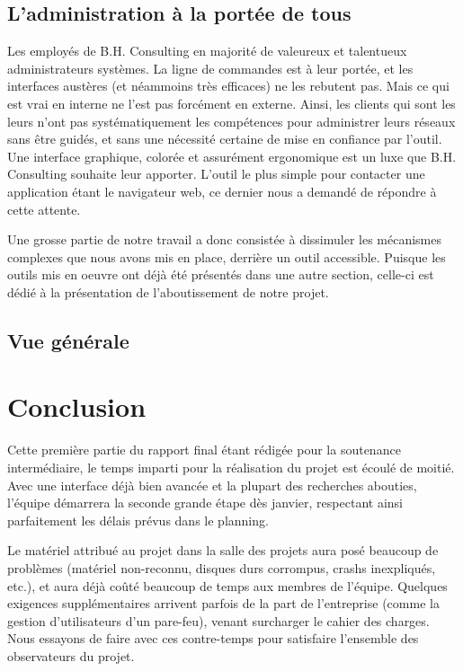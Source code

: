 \subsection{L'administration à la portée de tous}

Les employés de B.H. Consulting en majorité de valeureux et talentueux administrateurs systèmes. La ligne de commandes est à leur portée, et les interfaces austères (et néammoins très efficaces) ne les rebutent pas. Mais ce qui est vrai en interne ne l'est pas forcément en externe. Ainsi, les clients qui sont les leurs n'ont pas systématiquement les compétences pour administrer leurs réseaux sans être guidés, et sans une nécessité certaine de mise en confiance par l'outil. Une interface graphique, colorée et assurément ergonomique est un luxe que B.H. Consulting souhaite leur apporter. L'outil le plus simple pour contacter une application étant le navigateur web, ce dernier nous a demandé de répondre à cette attente.

Une grosse partie de notre travail a donc consistée à dissimuler les mécanismes complexes que nous avons mis en place, derrière un outil accessible. Puisque les outils mis en oeuvre ont déjà été présentés dans une autre section, celle-ci est dédié à la présentation de l'aboutissement de notre projet.

\subsection{Vue générale}





\section{Conclusion}

Cette première partie du rapport final étant rédigée pour la soutenance intermédiaire, le temps imparti pour la réalisation du projet est écoulé de moitié. Avec une interface déjà bien avancée et la plupart des recherches abouties, l'équipe démarrera la seconde grande étape dès janvier, respectant ainsi parfaitement les délais prévus dans le planning.

Le matériel attribué au projet dans la salle des projets aura posé beaucoup de problèmes (matériel non-reconnu, disques durs corrompus, crashs inexpliqués, etc.), et aura déjà coûté beaucoup de temps aux membres de l'équipe. Quelques exigences supplémentaires arrivent parfois de la part de l'entreprise (comme la gestion d'utilisateurs d'un pare-feu), venant surcharger le cahier des charges. Nous essayons de faire avec ces contre-temps pour satisfaire l'ensemble des observateurs du projet.

